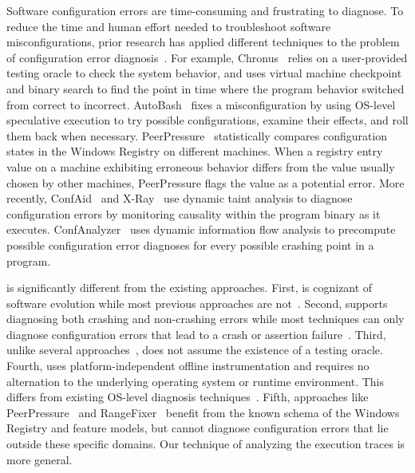 Software configuration errors are time-consuming
and frustrating to diagnose. To reduce the time and human
effort needed to troubleshoot software misconfigurations,
prior research has applied different techniques
to the problem of configuration error diagnosis~\cite{Attariyan:2008:UCD, 
Whitaker:2004:CDS, Wang:2004:AMT, rangefix,
Attariyan:2010:ACT, Rabkin:2011:PPC, keller:conferr}.
For example, Chronus~\cite{Whitaker:2004:CDS} relies
on a user-provided testing oracle to check the system behavior,
and uses
virtual machine checkpoint and binary search to find the
point in time where the program behavior
switched from correct to incorrect. AutoBash~\cite{Su:2007:AIC}
fixes a misconfiguration by using
OS-level speculative execution to try possible
configurations, examine their effects, and roll them back when necessary.
PeerPressure~\cite{Wang:2004:AMT} statistically
compares
configuration states in the Windows Registry on different machines.
When a registry entry value on a machine exhibiting erroneous behavior differs
from the value usually chosen by other machines, PeerPressure
flags the value as a potential error. More recently, 
ConfAid~\cite{Attariyan:2010:ACT} and X-Ray~\cite{xray}
use dynamic taint analysis to diagnose configuration errors
by monitoring causality within the program binary as it executes.
ConfAnalyzer~\cite{Rabkin:2011:PPC} uses dynamic information flow analysis to precompute
possible configuration error diagnoses for every possible crashing point
in a program. 

\ourtool is significantly different from the existing approaches.
First, \ourtool is cognizant of software evolution while
most previous approaches are not~\cite{Attariyan:2008:UCD, Whitaker:2004:CDS, 
Attariyan:2010:ACT, Rabkin:2011:PPC}.  Second,
\ourtool supports diagnosing both crashing and non-crashing errors while
most techniques can only diagnose configuration errors that lead to a crash or
assertion failure~\cite{Attariyan:2008:UCD, Whitaker:2004:CDS, 
Attariyan:2010:ACT, Rabkin:2011:PPC}.
Third, unlike several approaches~\cite{Attariyan:2010:ACT, Whitaker:2004:CDS},
\ourtool does not assume the existence of a testing oracle.
Fourth, \ourtool uses platform-independent offline instrumentation
and requires no alternation
to the underlying operating system or runtime environment. This
differs from existing OS-level diagnosis techniques~\cite{Whitaker:2004:CDS, Su:2007:AIC}.
Fifth, approaches like
PeerPressure~\cite{Wang:2004:AMT} and RangeFixer~\cite{rangefix}
benefit from the known schema of the Windows Registry and
feature models, but cannot diagnose configuration errors
that lie outside these specific domains. Our technique
of analyzing the execution traces is more general.


